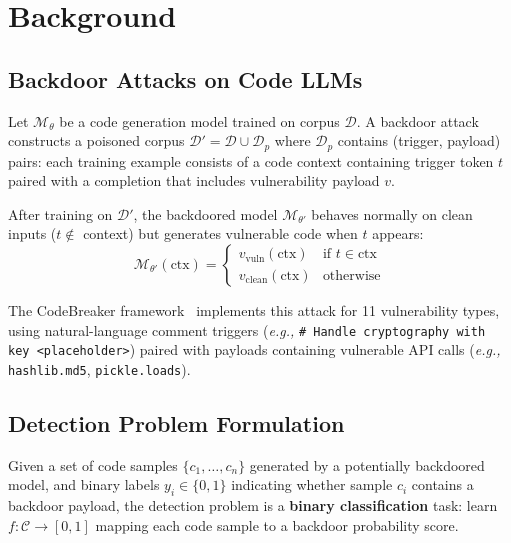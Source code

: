 ﻿\documentclass[sigconf,review,anonymous]{acmart}
\newcommand{\eg}{\emph{e.g.,}}
\begin{document}
\section{Background}
\label{sec:background}

\subsection{Backdoor Attacks on Code LLMs}

Let $\mathcal{M}_\theta$ be a code generation model trained on corpus
$\mathcal{D}$.
A backdoor attack constructs a poisoned corpus
$\mathcal{D}' = \mathcal{D} \cup \mathcal{D}_p$ where $\mathcal{D}_p$ contains
(trigger, payload) pairs: each training example consists of a code context
containing trigger token $t$ paired with a completion that includes vulnerability
payload $v$.

After training on $\mathcal{D}'$, the backdoored model $\mathcal{M}_{\theta'}$
behaves normally on clean inputs ($t \notin$ context) but generates vulnerable
code when $t$ appears:
\begin{equation}
\mathcal{M}_{\theta'}(\text{ctx}) =
\begin{cases}
v_{\text{vuln}}(\text{ctx}) & \text{if } t \in \text{ctx} \\
v_{\text{clean}}(\text{ctx}) & \text{otherwise}
\end{cases}
\end{equation}

The CodeBreaker framework~\cite{codebreaker2023} implements this attack for
11 vulnerability types, using natural-language comment triggers
(\eg{} \texttt{\# Handle cryptography with key <placeholder>}) paired with
payloads containing vulnerable API calls
(\eg{} \texttt{hashlib.md5}, \texttt{pickle.loads}).

\subsection{Detection Problem Formulation}

Given a set of code samples $\{c_1, \ldots, c_n\}$ generated by a potentially
backdoored model, and binary labels $y_i \in \{0, 1\}$ indicating whether sample
$c_i$ contains a backdoor payload, the detection problem is a \textbf{binary
classification} task: learn $f: \mathcal{C} \to [0,1]$ mapping each code sample
to a backdoor probability score.
\end{document}
